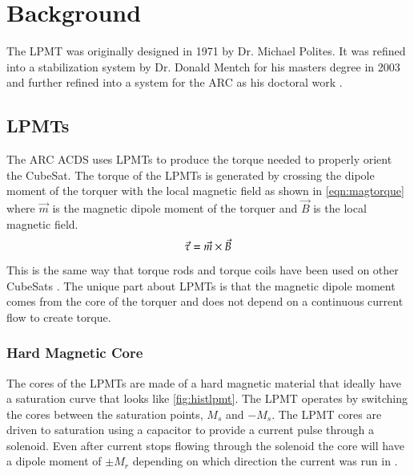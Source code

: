 

\chapter{Background}

\label{ch:BG}


The \ac{LPMT} was originally designed in 1971 by Dr. Michael Polites. It was refined into a stabilization system by Dr. Donald Mentch for his masters degree in 2003 and further refined into a system for the \ac{ARC} as his doctoral work \cite{Mentch11}.

\section{\aclp{LPMT}}

The \ac{ARC} \ac{ACDS} uses \acfp{LPMT} to produce the torque needed to properly orient the CubeSat. The torque of the \acp{LPMT} is generated by crossing the dipole moment of the torquer with the local magnetic field as shown in \autoref{eqn:magtorque} where $\vec{m}$ is the magnetic dipole moment of the torquer and $\vec{B}$ is the local magnetic field.
\begin{equation}
\vec{\tau} = \vec{m} \times \vec{B}
\label{eqn:magtorque}
\end{equation}
This is the same way that torque rods and torque coils have been used on other CubeSats . The unique part about \acp{LPMT} is that the magnetic dipole moment comes from the core of the torquer and does not depend on a continuous current flow to create torque.


\subsection{Hard Magnetic Core}

The cores of the \acp{LPMT} are made of a hard magnetic material that ideally have a saturation curve that looks like \autoref{fig:histlpmt}. The \ac{LPMT} operates by switching the cores between the saturation points, $M_s$ and $-M_s$. The \ac{LPMT} cores are driven to saturation using a capacitor to provide a current pulse through a solenoid. Even after current stops flowing through the solenoid the core will have a dipole moment of $\pm M_r$ depending on which direction the current was run in \cite{Mentch11}.

